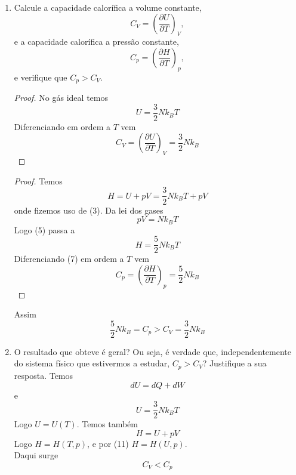 \documentclass[12pt, twoside, a4paper]{article}
\begin{document}
\begin{enumerate}[1.]
  \item Calcule a capacidade calorífica a volume constante,
  \begin{equation}
    C_V=\left(\frac{\partial U}{\partial T}\right)_V,
  \end{equation}
  e a capacidade calorífica a pressão constante,
  \begin{equation}
    C_p=\left(\frac{\partial H}{\partial T}\right)_p,
  \end{equation}
  e verifique que $C_p>C_V$.
  \begin{proof}
    No gás ideal temos
    \begin{equation}
      U = \frac{3}{2}Nk_BT
    \end{equation}
    Diferenciando em ordem a $T$ vem
    \begin{equation}
      C_V=\left(\frac{\partial U}{\partial T}\right)_V = \frac{3}{2}Nk_B
    \end{equation}
  \end{proof}
  \begin{proof}
    Temos
    \begin{equation}
      H = U+ pV = \frac{3}{2}Nk_BT+pV
    \end{equation}
    onde fizemos uso de (3).
    Da lei dos gases
    \begin{equation}
      pV=Nk_BT
    \end{equation}
    Logo (5) passa a
    \begin{equation}
      H = \frac{5}{2}Nk_BT
    \end{equation}
    Diferenciando (7) em ordem a $T$ vem
    \begin{equation}
      C_p = \left(\frac{\partial H}{\partial T}\right)_p = \frac{5}{2}Nk_B
    \end{equation}
  \end{proof}
  Assim
  \begin{equation}
    \frac{5}{2}Nk_B = C_p > C_V = \frac{3}{2}Nk_B
  \end{equation}
  \item O resultado que obteve é geral? Ou seja, é verdade que, independentemente do sistema físico que estivermos a estudar, $C_p > C_V$? Justifique a sua resposta.
  Temos
  \begin{equation}
    dU = dQ + dW
  \end{equation}
  e
  \begin{equation}
    U = \frac{3}{2}Nk_BT
  \end{equation}
  Logo $U=U(T)$. Temos também
  \begin{equation}
    H=U+pV
  \end{equation}
  Logo $H=H(T,p)$, e por (11) $H=H(U,p)$.\\
  Daqui surge
    \begin{equation}
      C_V < C_p
    \end{equation}
\end{enumerate}
\end{document}
